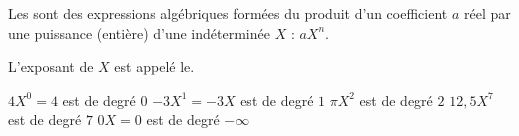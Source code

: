 \begin{Definition}[Monômes]
    Les sont des expressions algébriques formées du produit d'un coefficient $a$ réel par une puissance (entière) d'une indéterminée $X$ : $aX^n$. 
    
    L'exposant de $X$ est appelé le.

\end{Definition}

\begin{Exemple}
    \begin{tcbenumerate}[3]
        \tcbitem $4X^0=4$ est de degré $0$
        \tcbitem $-3X^1=-3X$ est de degré $1$
        \tcbitem $\pi X^2$ est de degré $2$
        \tcbitem $12{,}5X^7$ est de degré $7$
        \tcbitem $0X=0$ est de degré $-\infty$
    \end{tcbenumerate}
\end{Exemple}
